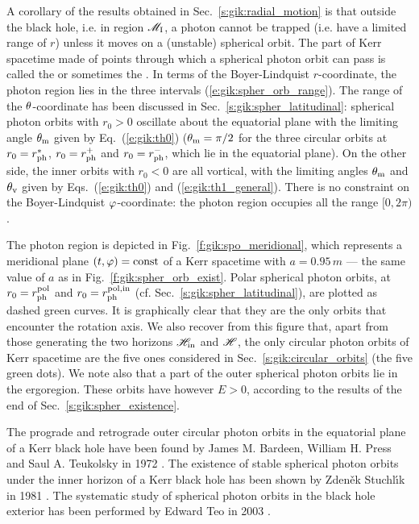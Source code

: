 A corollary of the results obtained in Sec.~\ref{s:gik:radial_motion}
is that outside the black hole, i.e. in region $\mathscr{M}_{\rm I}$, a photon
cannot be trapped (i.e. have a limited range of $r$) unless it moves
on a (unstable) spherical orbit. The part of Kerr spacetime made of points
through which a spherical photon orbit can pass is called the
 or sometimes the  \cite{Johns_al20}. In terms of the Boyer-Lindquist $r$-coordinate, the photon region
lies in the three intervals (\ref{e:gik:spher_orb_range}).
The range of the $\theta$-coordinate has been discussed in Sec.~\ref{s:gik:spher_latitudinal}:
spherical photon orbits with $r_0 > 0$ oscillate about the equatorial plane
with the limiting angle $\theta_{\rm m}$ given by Eq.~(\ref{e:gik:th0}) ($\theta_{\rm m}=\pi/2$
for the three circular orbits at $r_0 = r_{\rm ph}^*$, $r_0=r_{\rm ph}^+$
and $r_0 = r_{\rm ph}^-$, which lie in the equatorial plane). On the other side,
the inner orbits with $r_0 < 0$ are all vortical, with the limiting
angles $\theta_{\rm m}$ and $\theta_{\rm v}$ given by Eqs.~(\ref{e:gik:th0}) and (\ref{e:gik:th1_general}).
There is no constraint on the Boyer-Lindquist $\varphi$-coordinate: the photon region occupies
all the range $[0, 2\pi)$.

The photon region is depicted in Fig.~\ref{f:gik:spo_meridional}, which represents
a meridional plane $(t,\varphi) = \mathrm{const}$ of a Kerr spacetime with $a=0.95\, m$
--- the same value of $a$ as in Fig.~\ref{f:gik:spher_orb_exist}.
Polar spherical photon orbits, at $r_0 = r_{\rm ph}^{\rm pol}$ and $r_0 = r_{\rm ph}^{\rm pol,in}$
(cf. Sec.~\ref{s:gik:spher_latitudinal}), are plotted as dashed green curves.
It is graphically clear that they are the only orbits that encounter the rotation axis.
We also recover from this figure that, apart from those generating the two horizons $\mathscr{H}_{\rm in}$
and $\mathscr{H}$, the only circular photon orbits of Kerr spacetime are the
five ones considered in Sec.~\ref{s:gik:circular_orbits} (the five green dots).
We note also that a part of the outer spherical photon orbits lie in the ergoregion. These orbits
have however $E>0$, according to the results of the end of Sec.~\ref{s:gik:spher_existence}.

\begin{hist}
The prograde and retrograde outer circular photon orbits in the equatorial plane
of a Kerr black hole have been found by James M. Bardeen, William H. Press and Saul A. Teukolsky in 1972 \cite{BardePT72}.
The existence of stable spherical photon orbits under the inner horizon
of a Kerr black hole has been shown by Zden\v{e}k Stuchl\'{\i}k
in 1981 \cite{Stuch81}. The systematic study of spherical photon orbits
in the black hole exterior has been performed by Edward Teo in 2003 \cite{Teo03}.
\end{hist}


